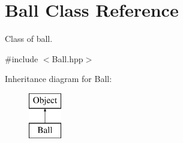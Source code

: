 \hypertarget{class_ball}{}\section{Ball Class Reference}
\label{class_ball}


Class of ball.  




{\ttfamily \#include $<$Ball.\+hpp$>$}

Inheritance diagram for Ball\+:\begin{figure}[H]
\begin{center}
\leavevmode
\includegraphics[height=2.000000cm]{class_ball}
\end{center}
\end{figure}
